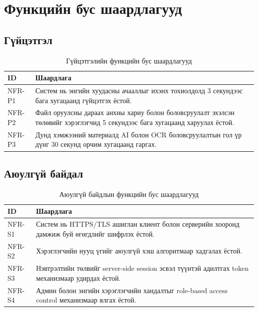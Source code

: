 \section{Функцийн бус шаардлагууд}

\subsection{Гүйцэтгэл}

\begin{table}[H]
\centering
\begin{tabular}{|p{3cm}|p{11cm}|}
\hline
\textbf{ID} & \textbf{Шаардлага} \\ \hline
NFR-P1 & Систем нь энгийн хуудасны ачааллыг ихэнх тохиолдолд 3 секундээс бага хугацаанд гүйцэтгэх ёстой. \\ \hline
NFR-P2 & Файл оруулсны дараах анхны хариу болон боловсруулалт эхэлсэн төлөвийг хэрэглэгчид 5 секундээс бага хугацаанд харуулах ёстой. \\ \hline
NFR-P3 & Дунд хэмжээний материалд AI болон OCR боловсруулалтын гол үр дүнг 30 секунд орчим хугацаанд гаргах. \\ \hline
\end{tabular}
\caption{Гүйцэтгэлийн функцийн бус шаардлагууд}
\end{table}

\subsection{Аюулгүй байдал}

\begin{table}[H]
\centering
\begin{tabular}{|p{3cm}|p{11cm}|}
\hline
\textbf{ID} & \textbf{Шаардлага} \\ \hline
NFR-S1 & Систем нь HTTPS/TLS ашиглан клиент болон серверийн хооронд дамжиж буй өгөгдлийг шифрлэх ёстой. \\ \hline
NFR-S2 & Хэрэглэгчийн нууц үгийг аюулгүй хэш алгоритмаар хадгалах ёстой. \\ \hline
NFR-S3 & Нэвтрэлтийн төлвийг server-side session эсвэл түүнтэй адилтгах token механизмаар удирдах ёстой. \\ \hline
NFR-S4 & Админ болон энгийн хэрэглэгчийн хандалтыг role-based access control механизмаар ялгах ёстой. \\ \hline
\end{tabular}
\caption{Аюулгүй байдлын функцийн бус шаардлагууд}
\end{table}

